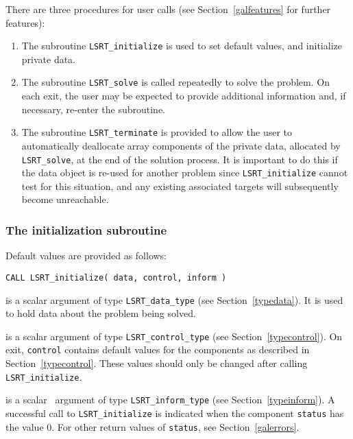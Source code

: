 \documentclass{galahad}
\newcommand{\packagename}{LS\-RT}
\begin{document}

\galarguments
There are three procedures for user calls
(see Section~\ref{galfeatures} for further features):

\begin{enumerate}
\item The subroutine
      {\tt \packagename\_initialize}
      is used to set default values, and initialize private data.
\item The subroutine
      {\tt \packagename\_solve}
      is called repeatedly to solve the problem.
      On each exit, the user may be expected to provide additional
      information and, if necessary, re-enter the subroutine.
\item The subroutine
      {\tt \packagename\_terminate}
      is provided to allow the user to automatically deallocate array
       components of the private data, allocated by
       {\tt \packagename\_solve},
       at the end of the solution process.
       It is important to do this if the data object is re-used for another
       problem since {\tt \packagename\_initialize} cannot test for this
       situation,
       and any existing associated targets will subsequently become
       unreachable.
\end{enumerate}


\subsubsection{The initialization subroutine}\label{subinit}
 Default values are provided as follows:

\hskip0.5in
{\tt CALL \packagename\_initialize( data, control, inform )}

\begin{description}

 is a scalar \intentinout argument of type
{\tt \packagename\_data\_type}
(see Section~\ref{typedata}). It is used to hold data about the problem being
solved.

 is a scalar \intentout argument of type
{\tt \packagename\_control\_type}
(see Section~\ref{typecontrol}).
On exit, {\tt control} contains default values for the components as
described in Section~\ref{typecontrol}.
These values should only be changed after calling
{\tt \packagename\_initialize}.

 is a scalar \intentout\ argument of type
{\tt \packagename\_inform\_type}
(see Section~\ref{typeinform}). A successful call to
{\tt \packagename\_initialize}
is indicated when the  component {\tt status} has the value 0.
For other return values of {\tt status}, see Section~\ref{galerrors}.

\end{description}
\end{document}
